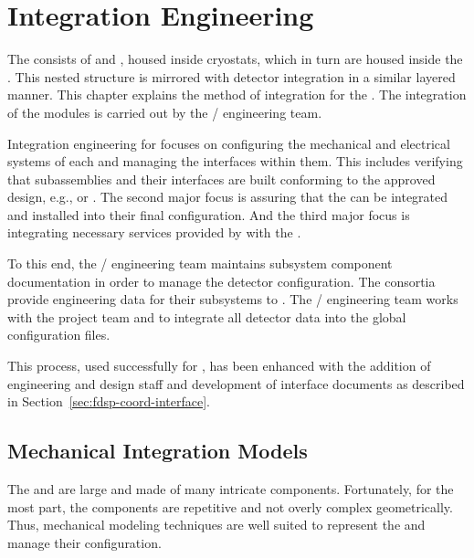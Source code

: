 \chapter{Integration Engineering}
\label{sec:fdsp-coord-integ-sysengr}

The   consists of  and
, housed inside cryostats, which in turn are housed
inside the  .  This nested structure is
mirrored with detector integration in a similar layered manner.  This
chapter explains the method of integration for the .
The integration of the modules is carried out by the
/ engineering team.

Integration engineering for  focuses on configuring the
mechanical and electrical systems of each  and managing
the interfaces within them. This includes verifying that subassemblies
and their interfaces are built conforming to the approved design,
e.g.,  or . The second major focus
is assuring that the  can be integrated and
installed into their final configuration. And the third major focus is
integrating necessary services provided by  
with the .


To this end, the / engineering team maintains
subsystem component documentation in order to manage the detector
configuration. The consortia provide engineering data for their
subsystems to . The / engineering team
works with the  project team and  to integrate
all detector data into the global  configuration files.

This process, used successfully for , %
has been enhanced with the addition of engineering
and design staff and development of interface documents as described
in Section~\ref{sec:fdsp-coord-interface}.

\section{Mechanical Integration Models}
\label{sec:fdsp-coord-integ-models}

The  and   are large and made of many
intricate components. Fortunately, for the most part, the
components are repetitive and not overly complex
geometrically. Thus, \threed mechanical modeling techniques are well suited
to represent the  and manage their configuration.

